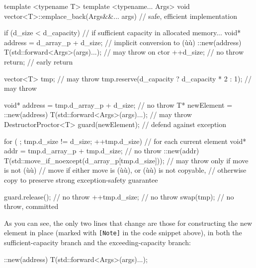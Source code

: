 \begin{emcppslisting}[emcppsbatch=e25]
template <typename T>
template <typename... Args>
void vector<T>::emplace_back(Args&&... args)  // safe, efficient implementation
{
    if (d_size < d_capacity)  // if sufficient capacity in allocated memory...
    {
        void* address = d_array_p + d_size;  // implicit conversion to (ù{}ù)
        ::new(address) T(std::forward<Args>(args)...);  // may throw on ctor
        ++d_size;                            // no throw
        return;                              // early return
    }

    vector<T> tmp;                                 // may throw
    tmp.reserve(d_capacity ? d_capacity * 2 : 1);  // may throw

    void* address = tmp.d_array_p + d_size;        // no throw
    T* newElement = ::new(address) T(std::forward<Args>(args)...); // may throw
    DestructorProctor<T> guard(newElement);        // defend against exception

    for ( ; tmp.d_size != d_size; ++tmp.d_size)    // for each current element
    {
        void* addr = tmp.d_array_p + tmp.d_size;   // no throw
        ::new(addr) T(std::move_if_noexcept(d_array_p[tmp.d_size]));
            // may throw only if move is not (ù{}ù)
            // move if either move is (ù{}ù), or (ù{}ù) is not copyable,
            // otherwise copy to preserve strong exception-safety guarantee
    }

    guard.release();  // no throw
    ++tmp.d_size;     // no throw
    swap(tmp);        // no throw, committed
}
\end{emcppslisting}
    

\noindent As you can see, the only two lines that change are those for
constructing the new element in place (marked with \lstinline![Note]! in
the code snippet above), in both the sufficient-capacity branch and the
exceeding-capacity branch:

\begin{emcppslisting}[emcppsignore={extracted from above code}]
::new(address) T(std::forward<Args>(args)...);
\end{emcppslisting}
    

